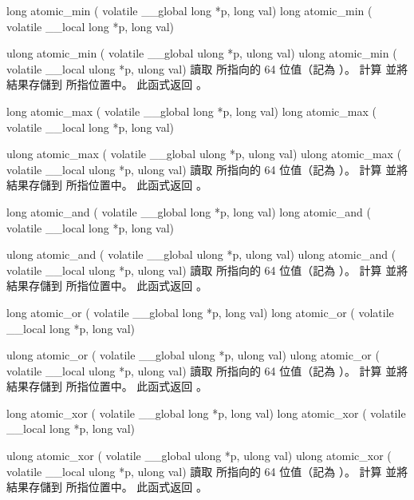 long atomic_min (
	volatile __global long *p,
	long val)
long atomic_min (
	volatile __local long *p,
	long val)

ulong atomic_min (
	volatile __global ulong *p,
	ulong val)
ulong atomic_min (
	volatile __local ulong *p,
	ulong val)
\stopbuffer
{}
讀取  所指向的 64 位值（記為 ）。
計算  並將結果存儲到  所指位置中。
此函式返回 。
\stopbuffer

long atomic_max (
	volatile __global long *p,
	long val)
long atomic_max (
	volatile __local long *p,
	long val)

ulong atomic_max (
	volatile __global ulong *p,
	ulong val)
ulong atomic_max (
	volatile __local ulong *p,
	ulong val)
\stopbuffer
{}
讀取  所指向的 64 位值（記為 ）。
計算  並將結果存儲到  所指位置中。
此函式返回 。
\stopbuffer

long atomic_and (
	volatile __global long *p,
	long val)
long atomic_and (
	volatile __local long *p,
	long val)

ulong atomic_and (
	volatile __global ulong *p,
	ulong val)
ulong atomic_and (
	volatile __local ulong *p,
	ulong val)
\stopbuffer
{}
讀取  所指向的 64 位值（記為 ）。
計算  並將結果存儲到  所指位置中。
此函式返回 。
\stopbuffer

long atomic_or (
	volatile __global long *p,
	long val)
long atomic_or (
	volatile __local long *p,
	long val)

ulong atomic_or (
	volatile __global ulong *p,
	ulong val)
ulong atomic_or (
	volatile __local ulong *p,
	ulong val)
\stopbuffer
{}
讀取  所指向的 64 位值（記為 ）。
計算  並將結果存儲到  所指位置中。
此函式返回 。
\stopbuffer

long atomic_xor (
	volatile __global long *p,
	long val)
long atomic_xor (
	volatile __local long *p,
	long val)

ulong atomic_xor (
	volatile __global ulong *p,
	ulong val)
ulong atomic_xor (
	volatile __local ulong *p,
	ulong val)
\stopbuffer
{}
讀取  所指向的 64 位值（記為 ）。
計算  並將結果存儲到  所指位置中。
此函式返回 。
\stopbuffer


\startCLFD
{}
\stopCLFD
